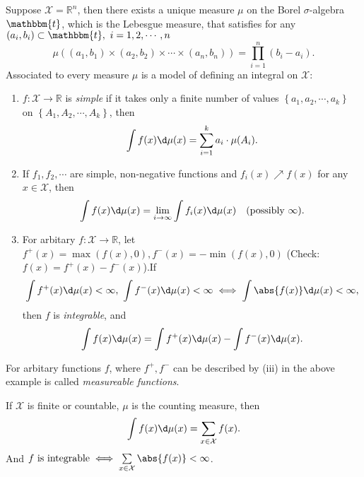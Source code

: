 \documentclass[a4paper]{article}
\begin{document}
\begin{eg}
	Suppose $\mathcal{X}=\mathbb{R}^n$, then there exists a unique measure $\mu$ on the Borel $\sigma$-algebra $\mathbbm{t}$, which is the Lebesgue measure, that satisfies for any  $(a_i, b_i) \subset \mathbbm{t}, \ i = 1,2, \cdots, n $
	\begin{equation}
		\mu \left((a_1, b_1) \times (a_2, b_2) \times \cdots \times (a_n, b_n)\right) = \prod\limits_{i = 1}^{n} (b_i - a_i).
	\end{equation}
	\newpage
	\noindent Associated to every measure $\mu$ is a model of defining an integral on $\mathcal{X}$:
	\begin{enumerate}
		\item $f: \mathcal{X} \to \mathbb{R}$ is \emph{simple} if it takes only a finite number of values $\left\{a_1, a_2, \cdots, a_k\right\}$ on $\left\{A_1, A_2, \cdots, A_k\right\}$, then
		\begin{equation}
			\int f(x) \d \mu (x) = \sum\limits_{i = 1}^{k} a_i \cdot \mu (A_i).
		\end{equation}
		\item If $f_1, f_2, \cdots$ are simple, non-negative functions and $f_i(x) \nearrow f(x)$ for any $x \in \mathcal{X}$, then
		\begin{equation}
			\int f(x) \d \mu (x) = \lim\limits_{i \rightarrow \infty} \int f_i(x) \d \mu (x) \quad (\text{possibly } \infty).
		\end{equation}
		\item For arbitary $f: \mathcal{X} \to \mathbb{R}$, let $f^+(x) = \max (f(x), 0), f^-(x) = -\min(f(x), 0)$ (Check: $f(x) = f^+(x) - f^-(x)$).If
		\begin{equation*}
			\int f^+(x) \d \mu (x) < \infty,\ \int f^-(x) \d \mu (x) < \infty \iff \int \abs{f(x)} \d \mu (x) <  \infty,
		\end{equation*}
		then $f$ is \emph{integrable}, and
		\begin{equation}
			\int f(x) \d \mu (x) = \int f^+(x) \d \mu (x) - \int f^-(x) \d \mu (x).
		\end{equation}
	\end{enumerate}
\end{eg}

\begin{remark}
	For arbitary functions $f$, where $f^+, f^-$ can be described by (iii) in the above example is called \emph{measureable functions}.
\end{remark}

\begin{eg}
	If $\mathcal{X}$ is finite or countable, $\mu$ is the counting measure, then
	\begin{equation}
		\int f(x) \d \mu (x) = \sum\limits_{x \in \mathcal{X}} f(x).
	\end{equation}
	And $f \text{ is integrable} \iff \sum\limits_{x \in \mathcal{X}} \abs{f(x)} < \infty$.
\end{eg}
\end{document}
